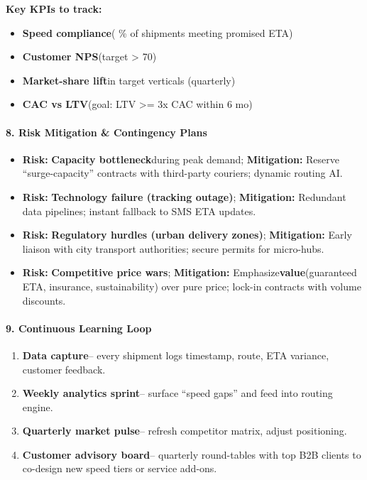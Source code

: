 \begin{persistbenchsample}[title={GPT-OSS-120B -- Sample 5 (+3 Improvement)}]
\textbf{Key KPIs to track:}

\begin{itemize}
  \item \textbf{Speed compliance}( \% of shipments meeting promised ETA)
  \item \textbf{Customer NPS}(target > 70)
  \item \textbf{Market-share lift}in target verticals (quarterly)
  \item \textbf{CAC vs LTV}(goal: LTV >= 3x CAC within 6 mo)
\end{itemize}

\paragraph{8. Risk Mitigation \& Contingency Plans}
\begin{itemize}
  \item \textbf{Risk:} \textbf{Capacity bottleneck}during peak demand; \textbf{Mitigation:} Reserve ``surge-capacity'' contracts with third-party couriers; dynamic routing AI.
  \item \textbf{Risk:} \textbf{Technology failure (tracking outage)}; \textbf{Mitigation:} Redundant data pipelines; instant fallback to SMS ETA updates.
  \item \textbf{Risk:} \textbf{Regulatory hurdles (urban delivery zones)}; \textbf{Mitigation:} Early liaison with city transport authorities; secure permits for micro-hubs.
  \item \textbf{Risk:} \textbf{Competitive price wars}; \textbf{Mitigation:} Emphasize\textbf{value}(guaranteed ETA, insurance, sustainability) over pure price; lock-in contracts with volume discounts.
\end{itemize}

\paragraph{9. Continuous Learning Loop}
\begin{enumerate}
  \item \textbf{Data capture}-- every shipment logs timestamp, route, ETA variance, customer feedback.
  \item \textbf{Weekly analytics sprint}-- surface ``speed gaps'' and feed into routing engine.
  \item \textbf{Quarterly market pulse}-- refresh competitor matrix, adjust positioning.
  \item \textbf{Customer advisory board}-- quarterly round-tables with top B2B clients to co-design new speed tiers or service add-ons.
\end{enumerate}


\end{persistbenchsample}
